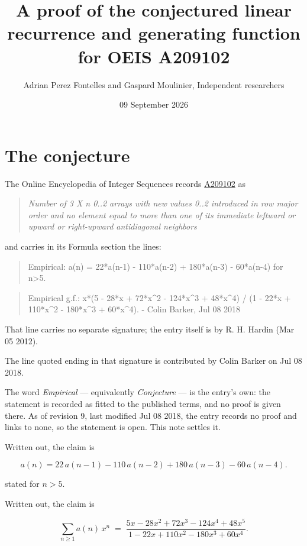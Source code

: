 \documentclass[11pt]{article}
\title{A proof of the conjectured linear recurrence and generating function for OEIS A209102}
\author{Adrian Perez Fontelles and Gaspard Moulinier, Independent researchers}
\date{09 September 2026}
\theoremstyle{definition}
\begin{document}
\maketitle
\section{The conjecture}

The Online Encyclopedia of Integer Sequences records \href{https://oeis.org/A209102}{A209102} as

\begin{quote}\itshape Number of 3 X n 0..2 arrays with new values 0..2 introduced in row major order and no element equal to more than one of its immediate leftward or upward or right-upward antidiagonal neighbors\end{quote}

and carries in its Formula section the lines:

\begin{quote}\ttfamily Empirical: a(n) = 22*a(n-1) - 110*a(n-2) + 180*a(n-3) - 60*a(n-4) for n>5.\end{quote}

\begin{quote}\ttfamily Empirical g.f.: x*(5 - 28*x + 72*x\textasciicircum{}2 - 124*x\textasciicircum{}3 + 48*x\textasciicircum{}4) / (1 - 22*x + 110*x\textasciicircum{}2 - 180*x\textasciicircum{}3 + 60*x\textasciicircum{}4). - Colin Barker, Jul 08 2018\end{quote}

That line carries no separate signature; the entry itself is by R. H. Hardin (Mar 05 2012).

The line quoted ending in that signature is contributed by Colin Barker on Jul 08 2018.

The word {\itshape Empirical} --- equivalently {\itshape Conjecture} --- is the entry's own: the statement is recorded as fitted to the published terms, and no proof is given there. As of revision 9, last modified Jul 08 2018, the entry records no proof and links to none, so the statement is open. This note settles it.

Written out, the claim is

\[a(n) = 22\,a(n-1) - 110\,a(n-2) + 180\,a(n-3) - 60\,a(n-4).\]

stated for $n > 5$.

Written out, the claim is

\[\sum_{n \ge 1} a(n)\,x^n \;=\; \frac{5x - 28x^{2} + 72x^{3} - 124x^{4} + 48x^{5}}{1 - 22x + 110x^{2} - 180x^{3} + 60x^{4}}.\]
\end{document}
